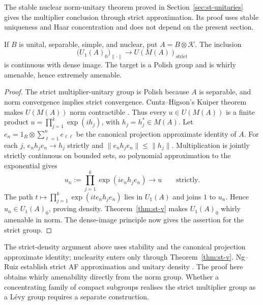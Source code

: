 The stable nuclear norm-unitary theorem proved in
Section~\ref{sec:st-unitaries} gives the multiplier conclusion through
strict approximation. Its proof uses stable uniqueness and Haar
concentration and does not depend on the present section.

\begin{theorem}\label{thm:st-multiplier-whirly}
 If $B$ is unital, separable, simple, and
nuclear, put $A=B\otimes\mathcal K$. The inclusion
\[
 \bigl(U_1(A)_0\bigr)_{\|\cdot\|}\longrightarrow U(M(A))_{\mathrm{strict}}
\]
is continuous with dense image. The target is a Polish group and is
whirly amenable, hence extremely amenable.
\end{theorem}

\begin{proof}
The strict multiplier-unitary group is Polish because $A$ is separable,
and norm convergence implies strict convergence. Cuntz--Higson's Kuiper
theorem makes $U(M(A))$ norm contractible \cite{CuntzHigson1987}. Thus every
$u\in U(M(A))$ is a finite product
$u=\prod_{j=1}^k\exp(ih_j)$, with $h_j=h_j^*\in M(A)$.
Let $e_n=1_B\otimes\sum_{\ell=1}^n e_{\ell\ell}$ be the canonical
projection approximate identity of $A$. For each $j$,
$e_nh_je_n\to h_j$ strictly and $\|e_nh_je_n\|\leq\|h_j\|$.
Multiplication is jointly strictly continuous on bounded sets, so
polynomial approximation to the exponential gives
\[
 u_n:=\prod_{j=1}^k\exp(ie_nh_je_n)\longrightarrow u
 \qquad\text{strictly}.
\]
The path $t\mapsto\prod_{j=1}^k\exp(it e_nh_je_n)$ lies in $U_1(A)$
and joins $1$ to $u_n$. Hence $u_n\in U_1(A)_0$, proving density.
Theorem~\ref{thm:st-v} makes $U_1(A)_0$ whirly amenable in norm.
The dense-image principle now gives the assertion for the strict group.
\end{proof}

\begin{remark}\label{rem:st-remark-1}
The strict-density argument above uses stability and the canonical
projection approximate identity; nuclearity enters only through
Theorem~\ref{thm:st-v}. Ng--Ruiz establish strict AF approximation and
unitary density \cite[Theorem~3.3 and Proposition~4.1(vi)]{NgRuiz2012}.
The proof here obtains whirly amenability directly from the norm group.
Whether a concentrating family of compact subgroups realises the strict
multiplier group as a L\'evy group requires a separate construction.
\end{remark}

